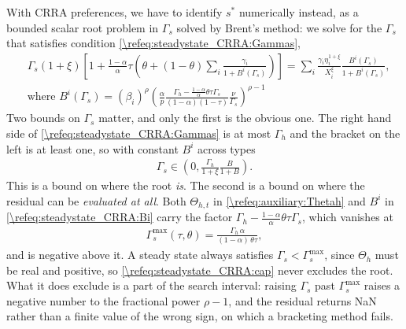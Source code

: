 With CRRA preferences, we have to identify $s^*$ numerically instead, as a bounded scalar root problem in $\Gamma_s$ solved by Brent's method: we solve for the $\Gamma_s$ that satisfies condition \eqref{\refeq:steadystate_CRRA:Gammas},
\begin{subequations}\label{\refeq:steadystate_CRRA}
\begin{align}
    &\Gamma_s(1+\xi)\left[1+\frac{1-\alpha}{\alpha}\tau\left(\theta+(1-\theta)\sum_i\frac{\gamma_i}{1+B^i(\Gamma_s)}\right)\right] = \sum_i\frac{\gamma_i\eta_i^{1+\xi}}{X_i^{\xi}} \frac{B^i(\Gamma_s)}{1+B^i(\Gamma_s)}, \label{\refeq:steadystate_CRRA:Gammas} \\
    &\text{where }B^i(\Gamma_s) = \left(\beta_i\right)^{\rho} \left(\frac{\alpha}{p}\frac{\Gamma_h-\frac{1-\alpha}{\alpha}\theta\tau\Gamma_s}{(1-\alpha)(1-\tau)}\frac{\nu}{\Gamma_s}   \right)^{\rho-1} \label{\refeq:steadystate_CRRA:Bi}
\end{align}
\end{subequations}
Two bounds on $\Gamma_s$ matter, and only the first is the obvious one. The right hand side of \eqref{\refeq:steadystate_CRRA:Gammas} is at most $\Gamma_h$ and the bracket on the left is at least one, so with constant $B^i$ across types
\begin{align}\label{\refeq:steadystate_CRRA:bounds}
    \Gamma_s \in \left(0, \frac{\Gamma_h}{1+\xi}\frac{B}{1+B}\right).
\end{align}
This is a bound on where the root \emph{is}. The second is a bound on where the residual can be \emph{evaluated at all}. Both $\Theta_{h,t}$ in \eqref{\refeq:auxiliary:Thetah} and $B^i$ in \eqref{\refeq:steadystate_CRRA:Bi} carry the factor $\Gamma_h-\frac{1-\alpha}{\alpha}\theta\tau\Gamma_s$, which vanishes at
\begin{align}\label{\refeq:steadystate_CRRA:cap}
    \Gamma_s^{\max}\left(\tau,\theta\right) = \frac{\Gamma_h\,\alpha}{(1-\alpha)\,\theta\tau},
\end{align}
and is negative above it. A steady state always satisfies $\Gamma_s<\Gamma_s^{\max}$, since $\Theta_{h}$ must be real and positive, so \eqref{\refeq:steadystate_CRRA:cap} never excludes the root. What it does exclude is a part of the search interval: raising $\Gamma_s$ past $\Gamma_s^{\max}$ raises a negative number to the fractional power $\rho-1$, and the residual returns NaN rather than a finite value of the wrong sign, on which a bracketing method fails.

